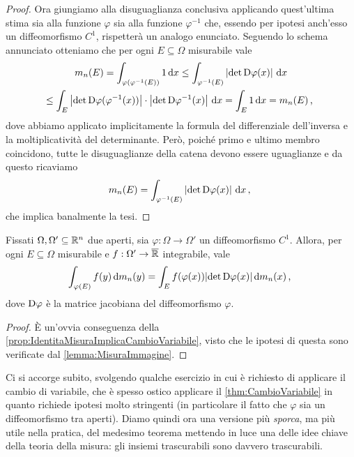 \begin{proof}
	Ora giungiamo alla disuguaglianza conclusiva applicando quest'ultima stima sia alla funzione $\varphi$ sia alla funzione $\varphi^{-1}$ che, essendo per ipotesi anch'esso un diffeomorfismo $C^1$, rispetterà un analogo enunciato.
	Seguendo lo schema annunciato otteniamo che per ogni $E\subseteq\Omega$ misurabile vale
	\begin{multline*}
		m_n(E) =\int_{\varphi(\varphi^{-1}(E))}1\,\mathrm d x\le \int_{\varphi^{-1}(E)} \left\lvert\det \mathrm D \varphi(x)\right\rvert\,\mathrm d x \\
 		\le \int_E \left\lvert\det \mathrm D \varphi(\varphi^{-1}(x))\right\rvert \cdot \left\lvert\det \mathrm D \varphi^{-1}(x)\right\rvert\,\mathrm d x =\int_E 1\,\mathrm d x=m_n(E) \, \text{, }
	\end{multline*}
	dove abbiamo applicato implicitamente la formula del differenziale dell'inversa e la moltiplicatività del determinante.
	Però, poiché primo e ultimo membro coincidono, tutte le disuguaglianze della catena devono essere uguaglianze e da questo ricaviamo
	\begin{equation*}
		m_n(E)=\int_{\varphi^{-1}(E)} \left\lvert\det \mathrm D \varphi(x)\right\rvert\,\mathrm d x \, \text{, }
	\end{equation*}
	che implica banalmente la tesi.
\end{proof}

\begin{theorem}\label{thm:CambioVariabile}
	Fissati $\Omega,\Omega'\subseteq\mathbb R^n$ due aperti, sia $\varphi:\Omega\to\Omega'$ un diffeomorfismo $C^1$.
	Allora, per ogni $E\subseteq \Omega$ misurabile e $f:\Omega'\to\overline{\mathbb R}$ integrabile, vale
	\begin{equation*}
		\int_{\varphi(E)} f(y)\,\mathrm d m_n(y) = \int_{E} f(\varphi(x))\lvert \det \mathrm D \varphi(x) \rvert \,\mathrm d m_n(x) \, \text{, }
	\end{equation*}
	dove $\mathrm D \varphi$ è la matrice jacobiana del diffeomorfismo $\varphi$.
\end{theorem}
\begin{proof}
	È un'ovvia conseguenza della \cref{prop:IdentitaMisuraImplicaCambioVariabile}, visto che le ipotesi di questa sono verificate dal \cref{lemma:MisuraImmagine}.
\end{proof}

Ci si accorge subito, svolgendo qualche esercizio in cui è richiesto di applicare il cambio di variabile, che è spesso ostico applicare il \cref{thm:CambioVariabile} in quanto richiede ipotesi molto stringenti (in particolare il fatto che $\varphi$ sia un diffeomorfismo tra aperti). 
Diamo quindi ora una versione più \emph{sporca}, ma più utile nella pratica, del medesimo teorema mettendo in luce una delle idee chiave della teoria della misura: gli insiemi trascurabili sono davvero trascurabili.

